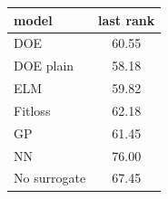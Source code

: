\begin{tabular}{|lc|}
\hline
model & last rank\\
\hline
DOE & 60.55 \\
DOE plain & 58.18 \\
ELM & 59.82 \\
Fitloss & 62.18 \\
GP & 61.45 \\
NN & 76.00 \\
No surrogate & 67.45 \\
\hline
\end{tabular}
